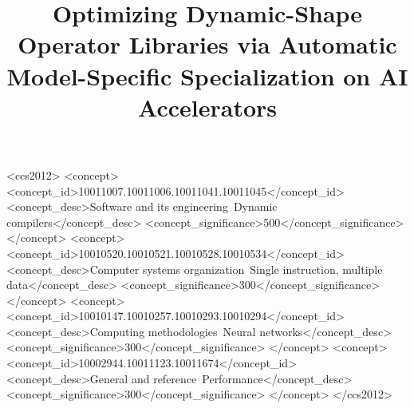 \documentclass[manuscript,screen,review]{acmart}
\begin{document}
\title{Optimizing Dynamic-Shape Operator Libraries via Automatic Model-Specific Specialization on AI Accelerators}






\begin{CCSXML}
	<ccs2012>
	<concept>
		<concept_id>10011007.10011006.10011041.10011045</concept_id>
		<concept_desc>Software and its engineering~Dynamic compilers</concept_desc>
		<concept_significance>500</concept_significance>
		</concept>
	<concept>
		<concept_id>10010520.10010521.10010528.10010534</concept_id>
		<concept_desc>Computer systems organization~Single instruction, multiple data</concept_desc>
		<concept_significance>300</concept_significance>
		</concept>
	<concept>
		<concept_id>10010147.10010257.10010293.10010294</concept_id>
		<concept_desc>Computing methodologies~Neural networks</concept_desc>
		<concept_significance>300</concept_significance>
		</concept>
	<concept>
		<concept_id>10002944.10011123.10011674</concept_id>
		<concept_desc>General and reference~Performance</concept_desc>
		<concept_significance>300</concept_significance>
		</concept>
	</ccs2012>
\end{CCSXML}
\end{document}
